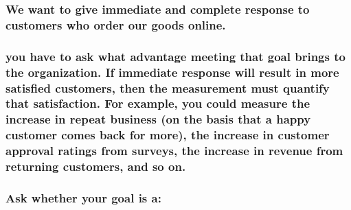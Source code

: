 \documentclass[
]{article}
\begin{document}
\hypertarget{we-want-to-give-immediate-and-complete-response-to-customers-who-order-our-goods-online.-1}{%
\subsubsection{We want to give immediate and complete response to
customers who order our goods
online.}\label{we-want-to-give-immediate-and-complete-response-to-customers-who-order-our-goods-online.-1}}

\hypertarget{you-have-to-ask-what-advantage-meeting-that-goal-brings-to-the-organization.-if-immediate-response-will-result-in-more-satisfied-customers-then-the-measurement-must-quantify-that-satisfaction.-for-example-you-could-measure-the-increase-in-repeat-business-on-the-basis-that-a-happy-customer-comes-back-for-more-the-increase-in-customer-approval-ratings-from-surveys-the-increase-in-revenue-from-returning-customers-and-so-on.}{%
\subsubsection{\texorpdfstring{you have to ask what advantage meeting
that goal brings to the organization. If immediate response will result
in more satisfied customers, then the measurement must quantify that
satisfaction. For example, you could measure the increase in repeat
business (on the basis that a happy customer comes back for more), the
increase in customer approval ratings from surveys, the increase in
revenue from returning customers, and so on.
}{you have to ask what advantage meeting that goal brings to the organization. If immediate response will result in more satisfied customers, then the measurement must quantify that satisfaction. For example, you could measure the increase in repeat business (on the basis that a happy customer comes back for more), the increase in customer approval ratings from surveys, the increase in revenue from returning customers, and so on. }}\label{you-have-to-ask-what-advantage-meeting-that-goal-brings-to-the-organization.-if-immediate-response-will-result-in-more-satisfied-customers-then-the-measurement-must-quantify-that-satisfaction.-for-example-you-could-measure-the-increase-in-repeat-business-on-the-basis-that-a-happy-customer-comes-back-for-more-the-increase-in-customer-approval-ratings-from-surveys-the-increase-in-revenue-from-returning-customers-and-so-on.}}

\hypertarget{ask-whether-your-goal-is-a}{%
\subsubsection{Ask whether your goal is
a:}\label{ask-whether-your-goal-is-a}}
\end{document}

